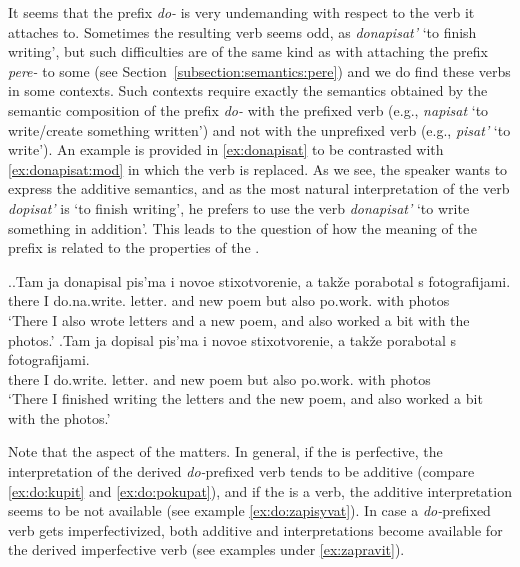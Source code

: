 It seems that the prefix \textit{do-} is very undemanding with respect to the verb it attaches to. Sometimes the resulting verb seems odd, as \textit{donapisat'} `to finish writing', but such difficulties are of the same kind as with attaching the  prefix \textit{pere-} to some  (see Section~\ref{subsection:semantics:pere}) and we do find these verbs in some contexts. Such contexts require exactly the semantics obtained by the semantic composition of the prefix \textit{do-} with the prefixed verb (e.g., \textit{napisat} `to write/create something written') and not with the unprefixed verb (e.g., \textit{pisat'} `to write'). An example is provided in \ref{ex:donapisat} to be contrasted with \ref{ex:donapisat:mod} in which the verb is replaced. As we see, the speaker wants to express the additive semantics, and as the most natural interpretation of the verb \textit{dopisat'} is `to finish writing', he prefers to use the verb \textit{donapisat'} `to write something in addition'. This leads to the question of how the meaning of the prefix is related to the properties of the .

\ex.\ag.\label{ex:donapisat}Tam ja donapisal pis'ma i novoe stixotvorenie, a tak\v{z}e porabotal s fotografijami.\\
there I do.na.write. letter. and new poem but also po.work. with photos\\
\trans `There I also wrote letters and a new poem, and also worked a bit with the photos.'
\bg.\label{ex:donapisat:mod}Tam ja dopisal pis'ma i novoe stixotvorenie, a tak\v{z}e porabotal s fotografijami.\\
there I do.write. letter. and new poem but also po.work. with photos\\
\trans `There I finished writing the letters and the new poem, and also worked a bit with the photos.'

Note that the aspect of the  matters. In general, if the  is perfective, the interpretation of the derived \textit{do-}prefixed verb tends to be additive (compare \ref{ex:do:kupit} and \ref{ex:do:pokupat}), and if the  is a  verb, the additive interpretation seems to be not available (see example \ref{ex:do:zapisyvat}). In case a \textit{do-}prefixed verb gets imperfectivized, both additive and  interpretations become available for the derived imperfective verb (see examples under \ref{ex:zapravit}).

